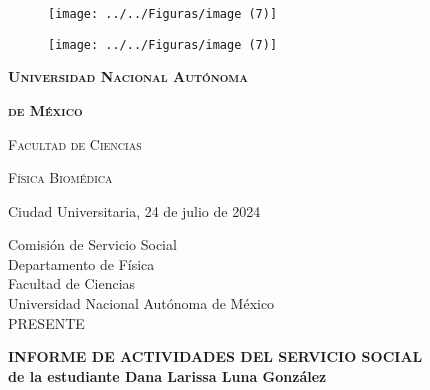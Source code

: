 \documentclass[8.5pt,letterpaper]{article}
\begin{document}
	
	\begin{figure}[h]
		\begin{center}
			\texttt{[image: ../../Figuras/image (7)]}
		\end{center}
	\end{figure}
	\begin{figure}[h]
		\begin{center}
			\texttt{[image: ../../Figuras/image (7)]}
		\end{center}
	\end{figure}
	\vspace{-10mm}
	
	\centerline{\Large \textbf{ \textsc{Universidad Nacional Autónoma} }}
	\vspace{2mm}
	\centerline{\Large \textbf{ \textsc{ de México} }}	
	\vspace{3mm}
	\centerline{\large \textsc{Facultad de Ciencias}}
	\vspace{2mm}
	\centerline{\large \textsc{Física Biomédica}}
	\vspace{-5pt}
	\begin{center}\hrulefill
	\end{center}
	\begin{flushright}Ciudad Universitaria, 24 de julio de 2024\end{flushright} 
	
	\begin{flushleft}
		Comisión de Servicio Social\\
		Departamento de Física\\
		Facultad de Ciencias\\
		Universidad Nacional Autónoma de México\\
		PRESENTE
	\end{flushleft} 
	\begin{center}
		\textbf{INFORME DE ACTIVIDADES DEL SERVICIO SOCIAL}\\
		\textbf{de la estudiante Dana Larissa Luna González}
	\end{center}
	
\end{document}
